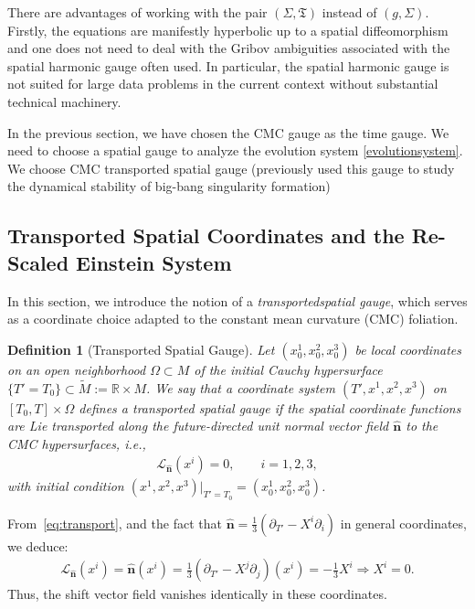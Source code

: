 \documentclass{amsart}
\newtheorem{definition}{Definition}
\begin{document}
\noindent There are advantages of working with the pair $(\Sigma,\mathfrak{T})$ instead of $(g,\Sigma)$. Firstly, the equations are manifestly hyperbolic up to a spatial diffeomorphism and one does not need to deal with the Gribov ambiguities associated with the spatial harmonic gauge often used. In particular, the spatial harmonic gauge is not suited for large data problems in the current context without substantial technical machinery.      

\noindent In the previous section, we have chosen the CMC gauge as the time gauge. We need to choose a spatial gauge to analyze the evolution system \ref{evolutionsystem}. We choose CMC transported spatial gauge (previously \cite{fajman2022cosmic,rodnianski2018regime} used this gauge to study the dynamical stability of big-bang singularity formation) 
\subsection{Transported Spatial Coordinates and the Re-Scaled Einstein System}
\noindent In this section, we introduce the notion of a \emph{transportedspatial gauge}, which serves as a coordinate choice adapted to the constant mean curvature (CMC) foliation. 

\begin{definition}[Transported Spatial Gauge]
\label{spatial}
Let $(x^1_0, x^2_0, x^3_0)$ be local coordinates on an open neighborhood $\Omega \subset M$ of the initial Cauchy hypersurface $\{T' = T_0\} \subset \widetilde{M} := \mathbb{R} \times M$. We say that a coordinate system $(T', x^1, x^2, x^3)$ on $[T_0, T] \times \Omega$ defines a \emph{transported spatial gauge} if the spatial coordinate functions are Lie transported along the future-directed unit normal vector field $\widehat{\mathbf{n}}$ to the CMC hypersurfaces, i.e.,
\begin{align}
\label{eq:transport}
\mathscr{L}_{\widehat{\mathbf{n}}}(x^i) = 0, \qquad i = 1,2,3,
\end{align}
with initial condition $(x^1, x^2, x^3)|_{T'=T_0} = (x^1_0, x^2_0, x^3_0)$.
\end{definition}

\noindent
From~\eqref{eq:transport}, and the fact that $\widehat{\mathbf{n}} = \frac{1}{3}(\partial_{T'} - X^i \partial_i)$ in general coordinates, we deduce:
\begin{align}
\label{eq:shift-vanishing}
\mathscr{L}_{\widehat{\mathbf{n}}}(x^{i})=\widehat{\mathbf{n}}(x^i) = \frac{1}{3}(\partial_{T'} - X^j \partial_j)(x^i) = -\frac{1}{3} X^i \Rightarrow X^i = 0.
\end{align}
Thus, the shift vector field vanishes identically in these coordinates.
\end{document}
